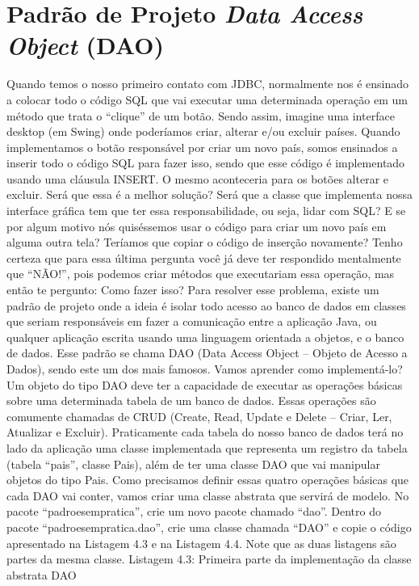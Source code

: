 \section{Padrão de Projeto \textit{Data Access Object} (DAO)}

Quando temos o nosso primeiro contato com JDBC, normalmente nos é ensinado a colocar todo o código SQL que vai executar uma determinada operação em um método que trata o “clique” de um botão. Sendo assim, imagine uma interface desktop (em Swing) onde poderíamos criar, alterar e/ou excluir países. Quando implementamos o botão responsável por criar um novo país, somos ensinados a inserir todo o código SQL para fazer isso, sendo que esse código é implementado usando uma cláusula INSERT. O mesmo aconteceria para os botões alterar e excluir. Será que essa é a melhor solução? Será que a classe que implementa nossa interface gráfica tem que ter essa responsabilidade, ou seja, lidar com SQL? E se por algum motivo nós quiséssemos usar o código para criar um novo país em alguma outra tela? Teríamos que copiar o código de inserção novamente? Tenho certeza que para essa última pergunta você já deve ter respondido mentalmente que “NÃO!”, pois podemos criar métodos que executariam essa operação, mas então te pergunto: Como fazer isso?
Para resolver esse problema, existe um padrão de projeto onde a ideia é isolar todo acesso ao banco de dados em classes que seriam responsáveis em fazer a comunicação entre a aplicação Java, ou qualquer aplicação escrita usando uma linguagem orientada a objetos, e o banco de dados. Esse padrão se chama DAO (Data Access Object – Objeto de Acesso a Dados), sendo este um dos mais famosos. Vamos aprender como implementá-lo?
Um objeto do tipo DAO deve ter a capacidade de executar as operações básicas sobre uma determinada tabela de um banco de dados. Essas operações são comumente chamadas de CRUD (Create, Read, Update e Delete – Criar, Ler, Atualizar e Excluir). Praticamente cada tabela do nosso banco de dados terá no lado da aplicação uma classe implementada que representa um registro da tabela (tabela “pais”, classe Pais), além de ter uma classe DAO que vai manipular objetos do tipo Pais. Como precisamos definir essas quatro operações básicas que cada DAO vai conter, vamos criar uma classe abstrata que servirá de modelo.
No pacote “padroesempratica”, crie um novo pacote chamado “dao”. Dentro do pacote “padroesempratica.dao”, crie uma classe chamada “DAO” e copie o código apresentado na Listagem 4.3 e na Listagem 4.4. Note que as duas listagens são partes da mesma classe.
Listagem 4.3: Primeira parte da implementação da classe abstrata DAO
 
